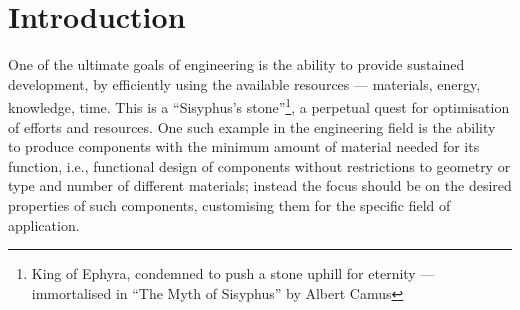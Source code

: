 

%

\chapter{Introduction}


One of the ultimate goals of engineering is the ability to provide sustained 
development, by efficiently using the available resources --- materials, energy,
knowledge, time. This is a ``Sisyphus's stone''\footnote{King of Ephyra,
condemned to push a stone uphill for eternity --- immortalised in ``The Myth of
Sisyphus'' by Albert Camus}, a perpetual quest for optimisation of efforts and
resources. One such example in the engineering field is the ability to produce
components with the minimum amount of material needed for its function, i.e.,
functional design of components without restrictions to geometry or type and
number of different materials; instead the focus should be on the desired
properties of such components, customising them for the specific field of
application. 




%


